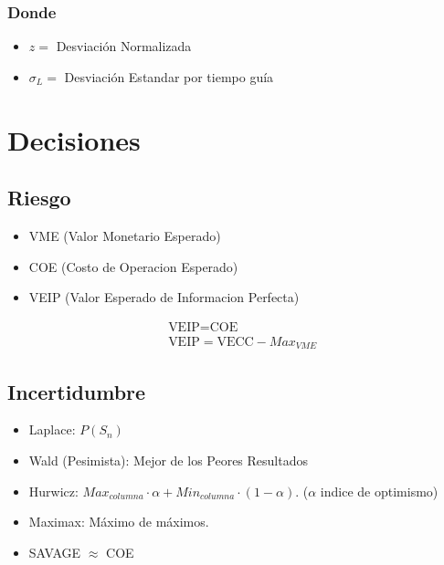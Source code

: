 \documentclass[10pt,letterpaper]{article}
\begin{document}
\subsubsection*{Donde}
\begin{itemize}
\item $z=$ Desviación Normalizada
\item $\sigma_L=$ Desviación Estandar por tiempo guía
\end{itemize}
\section{Decisiones}
\subsection{Riesgo}
\begin{minipage}[t]{.5\textwidth}
\raggedright
\begin{itemize}
\item VME (Valor Monetario Esperado)
\item COE (Costo de Operacion Esperado)
\item VEIP (Valor Esperado de Informacion Perfecta)
\end{itemize}
\end{minipage}%
\begin{minipage}[t]{.5\textwidth}
\raggedright
\vspace{-0.8cm}
\begin{align*}
& \text{VEIP} = \text{COE} \\
& \text{VEIP} = \text{VECC} - Max_{VME}
\end{align*}
\end{minipage}%
\subsection{Incertidumbre}
\begin{itemize}
\item Laplace: $P(S_n)$
\item Wald (Pesimista): Mejor de los Peores Resultados
\item Hurwicz: $Max_{columna}\cdot \alpha + Min_{columna}\cdot (1-\alpha)$. ($\alpha$ indice de optimismo)
\item Maximax: Máximo de máximos.
\item SAVAGE $\approx$ COE
\end{itemize}
\end{document}
